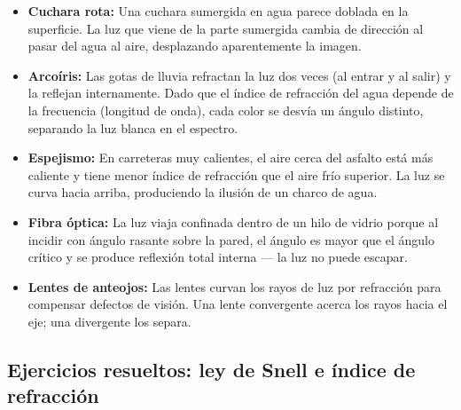 \begin{seccion}
\begin{itemize}
    \item \textbf{Cuchara rota:} Una cuchara sumergida en agua parece doblada en la superficie. La luz que viene de la parte sumergida cambia de dirección al pasar del agua al aire, desplazando aparentemente la imagen.
    \item \textbf{Arcoíris:} Las gotas de lluvia refractan la luz dos veces (al entrar y al salir) y la reflejan internamente. Dado que el índice de refracción del agua depende de la frecuencia (longitud de onda), cada color se desvía un ángulo distinto, separando la luz blanca en el espectro.
    \item \textbf{Espejismo:} En carreteras muy calientes, el aire cerca del asfalto está más caliente y tiene menor índice de refracción que el aire frío superior. La luz se curva hacia arriba, produciendo la ilusión de un charco de agua.
    \item \textbf{Fibra óptica:} La luz viaja confinada dentro de un hilo de vidrio porque al incidir con ángulo rasante sobre la pared, el ángulo es mayor que el ángulo crítico y se produce reflexión total interna — la luz no puede escapar.
    \item \textbf{Lentes de anteojos:} Las lentes curvan los rayos de luz por refracción para compensar defectos de visión. Una lente convergente acerca los rayos hacia el eje; una divergente los separa.
\end{itemize}
\end{seccion}

\subsection{Ejercicios resueltos: ley de Snell e índice de refracción}

